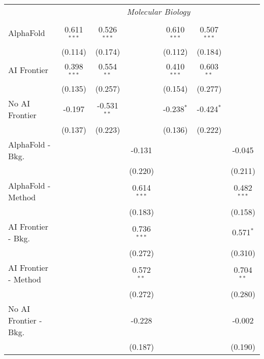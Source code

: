 \begin{tabular}{lcccccc}
 & \multicolumn{6}{c}{\textit{Molecular Biology}} \\ \\
   AlphaFold               & 0.611$^{***}$ & 0.526$^{***}$ &               & 0.610$^{***}$ & 0.507$^{***}$ &   \\   
                           & (0.114)       & (0.174)       &               & (0.112)       & (0.184)       &   \\   
   AI Frontier             & 0.398$^{***}$ & 0.554$^{**}$  &               & 0.410$^{***}$ & 0.603$^{**}$  &   \\   
                           & (0.135)       & (0.257)       &               & (0.154)       & (0.277)       &   \\   
   No AI Frontier          & -0.197        & -0.531$^{**}$ &               & -0.238$^{*}$  & -0.424$^{*}$  &   \\   
                           & (0.137)       & (0.223)       &               & (0.136)       & (0.222)       &   \\   
   AlphaFold - Bkg.        &               &               & -0.131        &               &               & -0.045\\   
                           &               &               & (0.220)       &               &               & (0.211)\\   
   AlphaFold - Method      &               &               & 0.614$^{***}$ &               &               & 0.482$^{***}$\\   
                           &               &               & (0.183)       &               &               & (0.158)\\   
   AI Frontier - Bkg.      &               &               & 0.736$^{***}$ &               &               & 0.571$^{*}$\\   
                           &               &               & (0.272)       &               &               & (0.310)\\   
   AI Frontier - Method    &               &               & 0.572$^{**}$  &               &               & 0.704$^{**}$\\   
                           &               &               & (0.272)       &               &               & (0.280)\\   
   No AI Frontier - Bkg.   &               &               & -0.228        &               &               & -0.002\\   
                           &               &               & (0.187)       &               &               & (0.190)\\   

\end{tabular}
